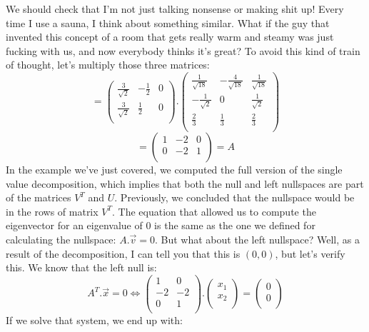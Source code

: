 \documentclass[600paper, 11pt,twoside,openany]{kdp}
\begin{document}
\indent We should check that I’m not just talking nonsense or making shit up! Every time I use a sauna, I think about something similar. What if the guy that invented this concept of a room that gets really warm and steamy was just fucking with us, and now everybody thinks it’s great? To avoid this kind of train of thought, let’s multiply those three matrices:
\[= \begin{pmatrix}
\frac{3}{\sqrt{2}} & -\frac{1}{2} & 0 \\
\frac{3}{\sqrt{2}} & \frac{1}{2} & 0 \\
\end{pmatrix}.
\begin{pmatrix}
\frac{1}{\sqrt{18}} &-\frac{4}{\sqrt{18}} & \frac{1}{\sqrt{18}}\\
 -\frac{1}{\sqrt{2}}   & 0 & \frac{1}{\sqrt{2}} \\
 \frac{2}{3} &\frac{1}{3} & \frac{2}{3}\\
\end{pmatrix}
\]
\[= \begin{pmatrix}
1 & -2 & 0\\
0 & -2 & 1 \\
\end{pmatrix} = A
\]
\indent In the example we’ve just covered, we computed the full version of the single value decomposition, which implies that both the null and left nullspaces are part of the matrices $V^T$ and $U$. Previously, we concluded that the nullspace would be in the rows of matrix $V^T$. The equation that allowed us to compute the eigenvector for an eigenvalue of 0 is the same as the one we defined for calculating the nullspace: $A.\overrightarrow{v} = 0$. But what about the left nullspace? Well, as a result of the decomposition, I can tell you that this is $(0,0)$, but let’s verify this. We know that the left null is:
\[A^T.\overrightarrow{x} = 0 \Leftrightarrow \begin{pmatrix}
1 & 0 \\
-2 & -2 \\
0 & 1 \\
\end{pmatrix}. \begin{pmatrix}
x_1\\
x_2\\
\end{pmatrix} =
\begin{pmatrix}
0\\
0\\
\end{pmatrix}
\]
\indent If we solve that system, we end up with:
\end{document}
